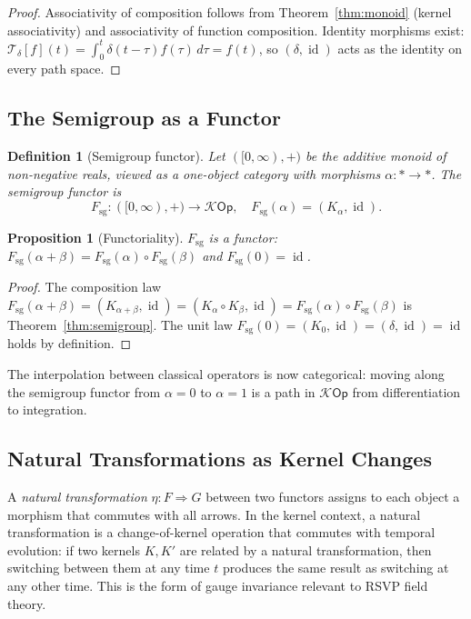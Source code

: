 \documentclass[12pt]{article}
\newtheorem{proposition}[theorem]{Proposition}
\newtheorem{definition}[theorem]{Definition}
\DeclareMathOperator{\id}{id}
\newcommand{\Kcal}{\mathcal{K}}
\begin{document}
\begin{proof}
Associativity of composition follows from Theorem~\ref{thm:monoid} (kernel
associativity) and associativity of function composition. Identity morphisms
exist: $\mathcal{T}_\delta[f](t) = \int_0^t \delta(t-\tau) f(\tau)\,d\tau = f(t)$,
so $(\delta, \id)$ acts as the identity on every path space.
\end{proof}

\subsection{The Semigroup as a Functor}

\begin{definition}[Semigroup functor]
Let $([0,\infty), +)$ be the additive monoid of non-negative reals, viewed
as a one-object category with morphisms $\alpha \colon * \to *$. The
\emph{semigroup functor} is
\[
  F_{\mathrm{sg}} \colon ([0,\infty), +) \to \Kcal\mathsf{Op},
  \quad
  F_{\mathrm{sg}}(\alpha) = (K_\alpha, \id).
\]
\end{definition}

\begin{proposition}[Functoriality]
$F_{\mathrm{sg}}$ is a functor: $F_{\mathrm{sg}}(\alpha + \beta) =
F_{\mathrm{sg}}(\alpha) \circ F_{\mathrm{sg}}(\beta)$ and
$F_{\mathrm{sg}}(0) = \id$.
\end{proposition}

\begin{proof}
The composition law $F_{\mathrm{sg}}(\alpha+\beta) = (K_{\alpha+\beta}, \id) =
(K_\alpha \circ K_\beta, \id) = F_{\mathrm{sg}}(\alpha)\circ F_{\mathrm{sg}}(\beta)$
is Theorem~\ref{thm:semigroup}. The unit law $F_{\mathrm{sg}}(0) = (K_0, \id)
= (\delta, \id) = \id$ holds by definition.
\end{proof}

The interpolation between classical operators is now categorical: moving along
the semigroup functor from $\alpha = 0$ to $\alpha = 1$ is a path in
$\Kcal\mathsf{Op}$ from differentiation to integration.

\subsection{Natural Transformations as Kernel Changes}

A \emph{natural transformation} $\eta \colon F \Rightarrow G$ between two
functors assigns to each object a morphism that commutes with all arrows.
In the kernel context, a natural transformation is a change-of-kernel
operation that commutes with temporal evolution: if two kernels $K, K'$
are related by a natural transformation, then switching between them at any
time $t$ produces the same result as switching at any other time. This is
the form of gauge invariance relevant to RSVP field theory.
\end{document}
